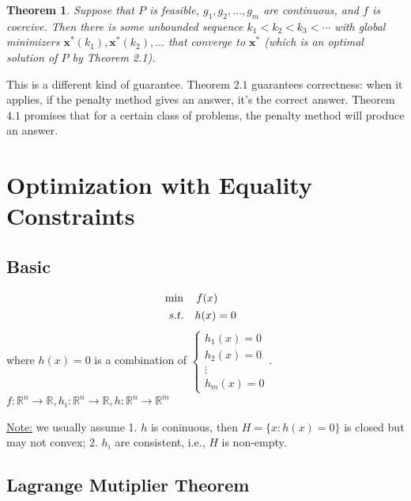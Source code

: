 \documentclass[11pt,a4paper]{article}
\newtheorem{theorem}{Theorem}
\begin{document}
\begin{theorem}
    Suppose that $P$ is feasible, $g_1, g_2, \ldots, g_m$ are continuous, and $f$ is coercive.
    Then there is some unbounded sequence $k_1<k_2<k_3<\cdots$ with global minimizers $\mathbf{x}^*\left(k_1\right), \mathbf{x}^*\left(k_2\right), \ldots$ that converge to $\mathbf{x}^*$ (which is an optimal solution of $P$ by Theorem 2.1).
\end{theorem}

This is a different kind of guarantee. Theorem $2.1$ guarantees correctness: when it applies, if the penalty method gives an answer, it's the correct answer. Theorem $4.1$ promises that for a certain class of problems, the penalty method will produce an answer.





\section{Optimization with Equality Constraints}
\subsection{Basic}
\begin{align*}
    &\min\quad f(x)\\
    &\begin{array}{r@{\quad}r@{}l@{\quad}l}
    s.t.
    &h(x)=0&\\
\end{array}
\end{align*}
where $h(x)=0$ is a combination of $\left\{\begin{matrix}
    h_1(x)=0\\
    h_2(x)=0\\
    \vdots\\
    h_m(x)=0
\end{matrix}\right.$. $f:\mathbb{R}^n \rightarrow \mathbb{R}, h_i:\mathbb{R}^n \rightarrow \mathbb{R}, h:\mathbb{R}^n \rightarrow \mathbb{R}^m$

\underline{Note:} we usually assume 1. $h$ is coninuous, then $H=\{x:h(x)=0\}$ is closed but may not convex; 2. $h_i$ are consistent, i.e., $H$ is non-empty.

\subsection{Lagrange Mutiplier Theorem}
\end{document}
